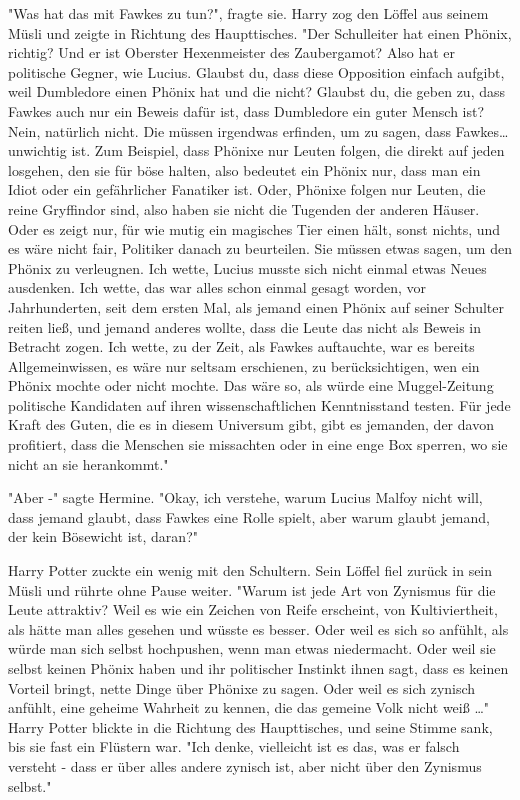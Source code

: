 {"Was hat das mit Fawkes zu tun?", fragte sie. Harry zog den Löffel aus seinem Müsli und zeigte in Richtung des Haupttisches. "Der Schulleiter hat einen Phönix, richtig? Und er ist Oberster Hexenmeister des Zaubergamot? Also hat er politische Gegner, wie Lucius. Glaubst du, dass diese Opposition einfach aufgibt, weil Dumbledore einen Phönix hat und die nicht? Glaubst du, die geben zu, dass Fawkes auch nur ein Beweis dafür ist, dass Dumbledore ein guter Mensch ist? Nein, natürlich nicht. Die müssen irgendwas erfinden, um zu sagen, dass Fawkes… unwichtig ist. Zum Beispiel, dass Phönixe nur Leuten folgen, die direkt auf jeden losgehen, den sie für böse halten, also bedeutet ein Phönix nur, dass man ein Idiot oder ein gefährlicher Fanatiker ist. Oder, Phönixe folgen nur Leuten, die reine Gryffindor sind, also haben sie nicht die Tugenden der anderen Häuser. Oder es zeigt nur, für wie mutig ein magisches Tier einen hält, sonst nichts, und es wäre nicht fair, Politiker danach zu beurteilen. Sie müssen etwas sagen, um den Phönix zu verleugnen. Ich wette, Lucius musste sich nicht einmal etwas Neues ausdenken. Ich wette, das war alles schon einmal gesagt worden, vor Jahrhunderten, seit dem ersten Mal, als jemand einen Phönix auf seiner Schulter reiten ließ, und jemand anderes wollte, dass die Leute das nicht als Beweis in Betracht zogen. Ich wette, zu der Zeit, als Fawkes auftauchte, war es bereits Allgemeinwissen, es wäre nur seltsam erschienen, zu berücksichtigen, wen ein Phönix mochte oder nicht mochte. Das wäre so, als würde eine Muggel-Zeitung politische Kandidaten auf ihren wissenschaftlichen Kenntnisstand testen. Für jede Kraft des Guten, die es in diesem Universum gibt, gibt es jemanden, der davon profitiert, dass die Menschen sie missachten oder in eine enge Box sperren, wo sie nicht an sie herankommt."

"Aber -" sagte Hermine. "Okay, ich verstehe, warum Lucius Malfoy nicht will, dass jemand glaubt, dass Fawkes eine Rolle spielt, aber warum glaubt jemand, der kein Bösewicht ist, daran?"

Harry Potter zuckte ein wenig mit den Schultern. Sein Löffel fiel zurück in sein Müsli und rührte ohne Pause weiter. "Warum ist jede Art von Zynismus für die Leute attraktiv? Weil es wie ein Zeichen von Reife erscheint, von Kultiviertheit, als hätte man alles gesehen und wüsste es besser. Oder weil es sich so anfühlt, als würde man sich selbst hochpushen, wenn man etwas niedermacht. Oder weil sie selbst keinen Phönix haben und ihr politischer Instinkt ihnen sagt, dass es keinen Vorteil bringt, nette Dinge über Phönixe zu sagen. Oder weil es sich zynisch anfühlt, eine geheime Wahrheit zu kennen, die das gemeine Volk nicht weiß …" Harry Potter blickte in die Richtung des Haupttisches, und seine Stimme sank, bis sie fast ein Flüstern war. "Ich denke, vielleicht ist es das, was er falsch versteht - dass er über alles andere zynisch ist, aber nicht über den Zynismus selbst."

}
